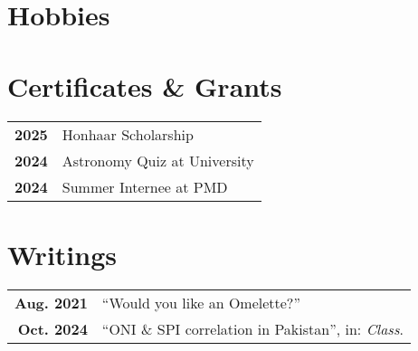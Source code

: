 \documentclass[lighthipster]{hipstercv}
\begin{document}
\begin{paracol}{2}
\begin{minipage}[t]{0.16\textwidth}
        \section*{Hobbies}
         \hfill

         \hfill
    \end{minipage}
    \vspace{2em}

    \begin{minipage}[t]{0.3\textwidth}
        \section*{Certificates \& Grants}
        \begin{tabular}{>{\footnotesize\bfseries}r >{\footnotesize}p{}}
            2025 & Honhaar Scholarship          \\
            2024 & Astronomy Quiz at University \\
            2024 & Summer Internee at PMD       \\
        \end{tabular}

    \end{minipage}\hfill
    \begin{minipage}[t]{0.3\textwidth}
        \section*{Writings}
        \begin{tabular}{>{\footnotesize\bfseries}r >{\footnotesize}p{}}
            Aug. 2021 & ``Would you like an Omelette?''                           \\
            Oct. 2024 & ``ONI \& SPI correlation in Pakistan'', in: \emph{Class}. \\
        \end{tabular}


\end{minipage}
\end{paracol}
\end{document}
